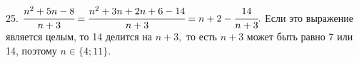 25. $\cfrac{n^2+5n-8}{n+3}=\cfrac{n^2+3n+2n+6-14}{n+3}=n+2-\cfrac{14}{n+3}.$ Если это выражение является целым, то 14 делится на $n+3,$ то есть $n+3$ может быть равно 7 или 14, поэтому $n\in \{4;11\}.$\\
